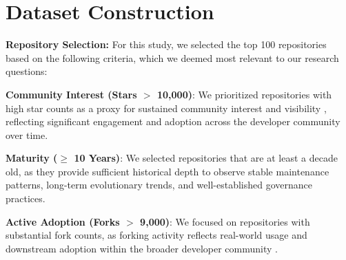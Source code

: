 \documentclass[10pt,conference]{IEEEtran}
\begin{document}



\section{Dataset Construction}\label{sec:dataset_const}

\textbf {Repository Selection:}
\label{Repository_Selection}
For this study, we selected the top 100 repositories based on the following criteria, which we deemed most relevant to our research questions:

\noindent \textbf{Community Interest (Stars $>$ 10,000)}: We prioritized 
repositories with high star counts as a proxy for sustained community 
interest and visibility \cite{borges2018s}, reflecting significant 
engagement and adoption across the developer community over time.

\noindent \textbf{Maturity ($\ge$ 10 Years)}: We selected repositories that 
are at least a decade old, as they provide sufficient historical depth 
to observe stable maintenance patterns, long-term evolutionary trends, 
and well-established governance practices.

\noindent \textbf{Active Adoption (Forks $>$ 9,000)}: We focused on 
repositories with substantial fork counts, as forking activity reflects 
real-world usage and downstream adoption within the broader developer 
community \cite{jiang2017and}.
    
\end{document}
